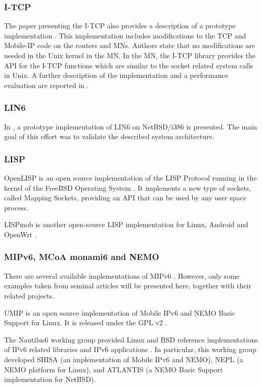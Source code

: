 \documentclass[preprint,12pt]{elsarticle}
\begin{document}
\subsubsection*{I-TCP} 
The paper presenting the I-TCP also provides a description of a prototype 
implementation \cite{itcp}. This implementation includes 
modifications to the TCP and Mobile-IP code on the routers and MNs. 
Authors state that no modifications are needed in the Unix kernel in the MN.
In the MN, the I-TCP library provides the \ac{API} for the I-TCP functions
which are similar to the socket related system 
calls in Unix. A further description of the implementation and a performance 
evaluation are reported in \cite{itcp:perf}.

\subsubsection*{LIN6} 
In \cite{draft-teraoka-ipng,kunishi2000lin6}, a prototype implementation of 
LIN6 on NetBSD/i386 is presented. The main goal of this 
effort was to validate the described system architecture.

\subsubsection*{LISP} 
OpenLISP is an open source implementation of the LISP Protocol running in the 
kernel of the FreeBSD Operating System \cite{openlisp}.
It implements a new type of sockets, called Mapping Sockets, providing an 
\ac{API} that can be used by any user space process.

LISPmob is another open-source LISP implementation for Linux, 
Android and OpenWrt \cite{lispmob}. 


\subsubsection*{MIPv6, MCoA monami6 and NEMO} 
There are several available implementations of MIPv6 
\cite{Li:2009,nemo1,umip,tahi}. However, only some examples  taken from seminal articles will be presented here, together with their related projects.

UMIP is an open source implementation of Mobile IPv6 and NEMO Basic Support for 
Linux. It is released under the \ac{GPL} v2 \cite{umip}.

The Nautilus6 working group provided Linux and BSD reference implementations of 
IPv6 related libraries and IPv6 applications \cite{nemo1}. In particular, 
this working group developed SHISA (an implementation of Mobile IPv6 and 
NEMO), NEPL (a NEMO platform for Linux), and ATLANTIS (a NEMO Basic Support 
implementation for NetBSD).
\end{document}
